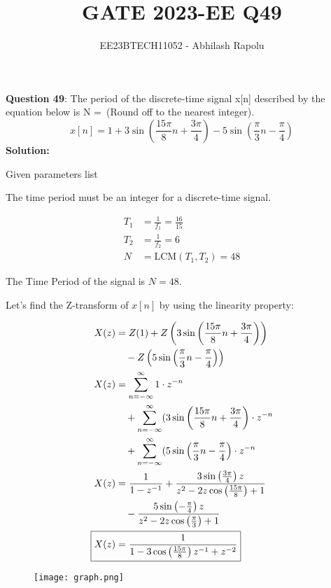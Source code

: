 \documentclass[journal,12pt,twocolumn]{IEEEtran}
\title{GATE 2023-EE Q49}
\author{EE23BTECH11052 - Abhilash Rapolu}
\begin{document}
\maketitle
\newpage
\textbf{Question 49}: The period of the discrete-time signal x[n] described by the equation below is N =\ (Round off to the nearest integer).
$$x[n] = 1 + 3\sin\left(\frac{15\pi}{8}n + \frac{3\pi}{4}\right) - 5\sin\left(\frac{\pi}{3}n - \frac{\pi}{4}\right)$$
\textbf{Solution:}
\begin{table}[htbp]
\centering

\caption{Given parameters list}
\end{table}

The time period must be an integer for a discrete-time signal.

\begin{align}
T_1 &= \frac{1}{f_1} = \frac{16}{15} \\
T_2 &= \frac{1}{f_2} = 6 \\
N &= \text{LCM}(T_1, T_2) = 48
\end{align}

The Time Period of the signal is \(N = 48\).

Let's find the Z-transform of $x[n]$ by using the linearity property:

\begin{align}
X(z) &= Z(1) + Z\left(3\sin\left(\frac{15\pi}{8}n + \frac{3\pi}{4}\right)\right)\\
&\quad - Z\left(5\sin\left(\frac{\pi}{3}n - \frac{\pi}{4}\right)\right)\\
X(z) &= \sum_{n=-\infty}^{\infty} 1 \cdot z^{-n} \\
&\quad + \sum_{n=-\infty}^{\infty} (3\sin\left(\frac{15\pi}{8}n + \frac{3\pi}{4}\right) \cdot z^{-n} \\
&\quad + \sum_{n=-\infty}^{\infty} (5\sin\left(\frac{\pi}{3}n - \frac{\pi}{4}\right) \cdot z^{-n}\\
X(z) &= \frac{1}{1 - z^{-1}} + \frac{3\sin\left(\frac{3\pi}{4}\right)z}{z^2 - 2z\cos\left(\frac{15\pi}{8}\right) + 1} \\
&\quad - \frac{5\sin\left(-\frac{\pi}{4}\right)z}{z^2 - 2z\cos\left(\frac{\pi}{3}\right) + 1}\\
\Aboxed{X(z) &= \frac{1}{1 - 3\cos\left(\frac{15\pi}{8}\right)z^{-1} + z^{-2}} 
&\quad + \frac{5}{1 - 2\cos\left(\frac{\pi}{3}\right)z^{-1} + z^{-2}}} 
\end{align}
\begin{figure}[!ht] 
\centering
\texttt{[image: graph.png]}
\label{fig:Graph1}
\end{figure}
\end{document}
